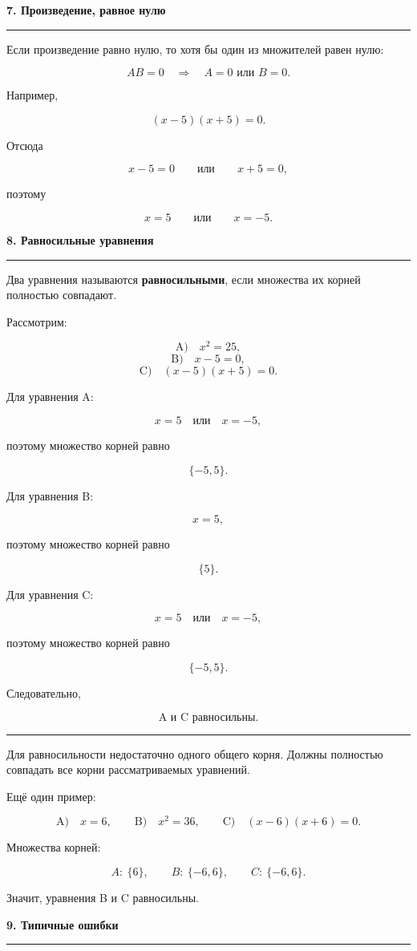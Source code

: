 \documentclass[a4paper,12pt]{article}
\newcommand{\sectiontitle}[1]{%
    \vspace{0.35em}%
    {\Large\bfseries\color{darkaccent}#1\par}%
    \vspace{0.2em}%
    {\color{accent}\rule{\linewidth}{0.7pt}}%
    \vspace{0.6em}%
}
\newcommand{\important}[1]{%
    \par\vspace{0.3em}%
    \noindent
    \begin{minipage}{\linewidth}
        {\color{accent}\rule{2.2pt}{\baselineskip}}\hspace{0.6em}%
        \begin{minipage}[t]{0.94\linewidth}
            #1
        \end{minipage}
    \end{minipage}%
    \par\vspace{0.3em}%
}
\begin{document}
\sectiontitle{7. Произведение, равное нулю}

Если произведение равно нулю, то хотя бы один из множителей равен нулю:

\[
AB=0
\quad\Longrightarrow\quad
A=0 \text{ или } B=0.
\]

Например,

\[
(x-5)(x+5)=0.
\]

Отсюда

\[
x-5=0
\qquad\text{или}\qquad
x+5=0,
\]

поэтому

\[
\boxed{x=5}
\qquad\text{или}\qquad
\boxed{x=-5}.
\]

\sectiontitle{8. Равносильные уравнения}

Два уравнения называются \textbf{равносильными}, если множества их
корней полностью совпадают.

Рассмотрим:

\[
\text{A)}\quad x^2=25,
\]
\[
\text{B)}\quad x-5=0,
\]
\[
\text{C)}\quad (x-5)(x+5)=0.
\]

Для уравнения A:

\[
x=5 \quad\text{или}\quad x=-5,
\]

поэтому множество корней равно

\[
\{-5,5\}.
\]

Для уравнения B:

\[
x=5,
\]

поэтому множество корней равно

\[
\{5\}.
\]

Для уравнения C:

\[
x=5 \quad\text{или}\quad x=-5,
\]

поэтому множество корней равно

\[
\{-5,5\}.
\]

Следовательно,

\[
\boxed{\text{A и C равносильны}.}
\]

\important{
Для равносильности недостаточно одного общего корня. Должны полностью
совпадать все корни рассматриваемых уравнений.
}

Ещё один пример:

\[
\text{A)}\quad x=6,
\qquad
\text{B)}\quad x^2=36,
\qquad
\text{C)}\quad (x-6)(x+6)=0.
\]

Множества корней:

\[
A:\ \{6\},
\qquad
B:\ \{-6,6\},
\qquad
C:\ \{-6,6\}.
\]

Значит, уравнения B и C равносильны.

\sectiontitle{9. Типичные ошибки}
\end{document}
